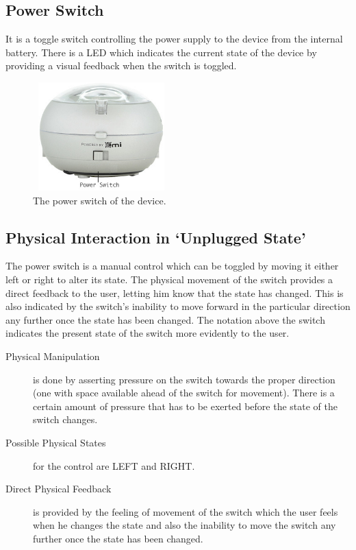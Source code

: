 \documentclass[10pt,a4paper]{article}
\begin{document}
\subsection{Power Switch}
It is a toggle switch controlling the power supply to the device from the internal battery. There is a LED which indicates the current state of the device by providing a visual feedback when the switch is toggled.

\begin{figure}[hbpt]
\centerline{\includegraphics[width=200px,height=158px,keepaspectratio]{DW2}}
\caption{The power switch of the device.}
\label{physical_state_power_switch}
\end{figure}

\subsection{Physical Interaction in `Unplugged State'}

The power switch is a manual control which can be toggled by moving it either left or right to alter its state. The physical movement of the switch provides a direct feedback to the user, letting him know that the state has changed. This is also indicated by the switch's inability to move forward in the particular direction any further once the state has been changed. The notation above the switch indicates the present state of the switch more evidently to the user. 

\begin{description}

\item [Physical Manipulation] is done by asserting pressure on the switch towards the proper direction (one with space available ahead of the switch for movement). There is a certain amount of pressure that has to be exerted before the state of the switch changes.

\item [Possible Physical States] for the control are LEFT and RIGHT.

\item [Direct Physical Feedback] is provided by the feeling of movement of the switch which the user feels when he changes the state and also the inability to move the switch any further once the state has been changed.
\end{description}
\end{document}
